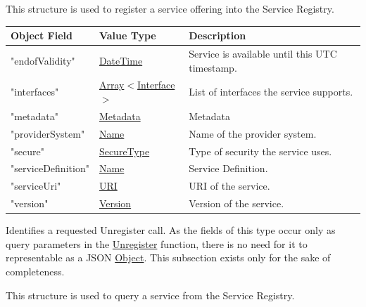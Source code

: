 \documentclass[a4paper]{arrowhead}
\newcommand{\oref}[1]{{\textcolor{ArrowheadBlue}{\hyperref[sec:operations:#1]{#1}}}}
\newcommand{\pref}[1]{{\textcolor{ArrowheadGrey}{\hyperref[sec:model:primitives:#1]{#1}}}}
\begin{document}

This structure is used to register a service offering into the Service Registry.

\begin{table}[ht!]
\begin{tabularx}{\textwidth}{| p{4.25cm} | p{3.5cm} | X |} \hline
\rowcolor{gray!33} Object Field & Value Type      & Description \\ \hline
"endofValidity"                 & \pref{DateTime} & Service is available until this UTC timestamp. \\ \hline
"interfaces"                   & \pref{Array}$<$\pref{Interface}$>$     & List of interfaces the service supports. \\ \hline
"metadata"                  & \pref{Metadata}     & Metadata \\ \hline
"providerSystem"                    & \pref{Name} & Name of the provider system. \\ \hline
"secure"                    &\pref{SecureType}  & Type of security the service uses. \\ \hline
"serviceDefinition"         &\pref{Name}        & Service Definition. \\ \hline
"serviceUri"                &\pref{URI}         & URI of the service. \\ \hline
"version"                   &\pref{Version}     & Version of the service. \\ \hline
\end{tabularx}
\end{table}


Identifies a requested Unregister call.
As the fields of this type occur only as query parameters in the \oref{Unregister} function, there is no need for it to representable as a JSON \pref{Object}.
This subsection exists only for the sake of completeness.


This structure is used to query a service from the Service Registry.
\end{document}
